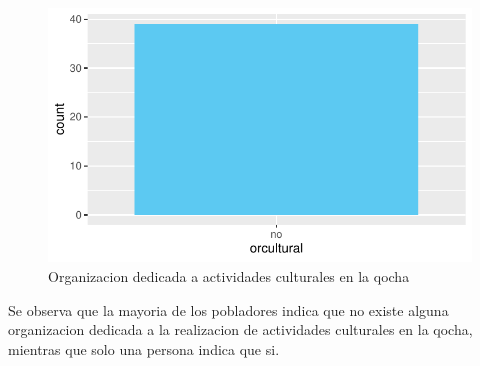 \documentclass[12pt]{article}\usepackage[]{graphicx}\usepackage[]{xcolor}
\makeatletter
\def\maxwidth{ %
  \ifdim\Gin@nat@width>\linewidth
    \linewidth
  \else
    \Gin@nat@width
  \fi
}
\newenvironment{knitrout}{}{} %
\makeatother
\begin{document}
	\begin{figure}[H]
	\centering
\begin{knitrout}
\color{fgcolor}
\includegraphics[width=\maxwidth]{figure/veintidos-1} 
\end{knitrout}
	\caption{Organizacion dedicada a actividades culturales en la qocha}
	\end{figure}
	Se observa que la mayoria de los pobladores indica que no existe alguna organizacion dedicada a la realizacion de actividades culturales en la qocha, mientras que solo una persona indica que si.  
\end{document}
